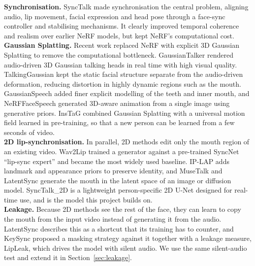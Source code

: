 \noindent
\textbf{Synchronisation.} SyncTalk \cite{peng2024synctalkdevilsynchronizationtalking} made synchronisation the central problem, aligning audio, lip movement, facial expression and head pose through a face-sync controller and stabilising mechanisms. It clearly improved temporal coherence and realism over earlier NeRF models, but kept NeRF's computational cost.\\

\noindent
\textbf{Gaussian Splatting.} Recent work replaced NeRF with explicit 3D Gaussian Splatting to remove the computational bottleneck. GaussianTalker \cite{cho2024gaussiantalkerrealtimehighfidelitytalking} rendered audio-driven 3D Gaussian talking heads in real time with high visual quality. TalkingGaussian \cite{li2024talkinggaussianstructurepersistent3dtalking} kept the static facial structure separate from the audio-driven deformation, reducing distortion in highly dynamic regions such as the mouth. GaussianSpeech \cite{aneja2024gaussianspeechaudiodrivengaussianavatars} added finer explicit modelling of the teeth and inner mouth, and NeRFFaceSpeech \cite{kim2024nerffacespeechoneshotaudiodriven3d} generated 3D-aware animation from a single image using generative priors. InsTaG \cite{li2025instaglearningpersonalized3d} combined Gaussian Splatting with a universal motion field learned in pre-training, so that a new person can be learned from a few seconds of video.\\

\noindent
\textbf{2D lip-synchronisation.} In parallel, 2D methods edit only the mouth region of an existing video. Wav2Lip \cite{prajwal2020wav2lip} trained a generator against a pre-trained SyncNet ``lip-sync expert'' \cite{chung2016outoftime} and became the most widely used baseline. IP-LAP \cite{zhong2023iplap} adds landmark and appearance priors to preserve identity, and MuseTalk \cite{zhang2024musetalk} and LatentSync \cite{li2024latentsync} generate the mouth in the latent space of an image or diffusion model. SyncTalk\_2D \cite{synctalk2d} is a lightweight person-specific 2D U-Net designed for real-time use, and is the model this project builds on.\\

\noindent
\textbf{Leakage.} Because 2D methods see the rest of the face, they can learn to copy the mouth from the input video instead of generating it from the audio. LatentSync \cite{li2024latentsync} describes this as a shortcut that its training has to counter, and KeySync \cite{bigata2025keysync} proposed a masking strategy against it together with a leakage measure, LipLeak, which drives the model with silent audio. We use the same silent-audio test and extend it in Section~\ref{sec:leakage}.\\


